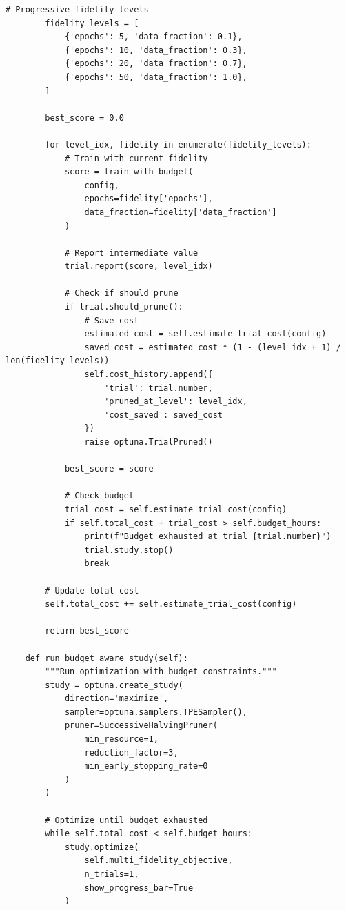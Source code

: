 \begin{lstlisting}[style=python, caption=Cost-efficient hyperparameter optimization]
        # Progressive fidelity levels
        fidelity_levels = [
            {'epochs': 5, 'data_fraction': 0.1},
            {'epochs': 10, 'data_fraction': 0.3},
            {'epochs': 20, 'data_fraction': 0.7},
            {'epochs': 50, 'data_fraction': 1.0},
        ]

        best_score = 0.0

        for level_idx, fidelity in enumerate(fidelity_levels):
            # Train with current fidelity
            score = train_with_budget(
                config,
                epochs=fidelity['epochs'],
                data_fraction=fidelity['data_fraction']
            )

            # Report intermediate value
            trial.report(score, level_idx)

            # Check if should prune
            if trial.should_prune():
                # Save cost
                estimated_cost = self.estimate_trial_cost(config)
                saved_cost = estimated_cost * (1 - (level_idx + 1) / len(fidelity_levels))
                self.cost_history.append({
                    'trial': trial.number,
                    'pruned_at_level': level_idx,
                    'cost_saved': saved_cost
                })
                raise optuna.TrialPruned()

            best_score = score

            # Check budget
            trial_cost = self.estimate_trial_cost(config)
            if self.total_cost + trial_cost > self.budget_hours:
                print(f"Budget exhausted at trial {trial.number}")
                trial.study.stop()
                break

        # Update total cost
        self.total_cost += self.estimate_trial_cost(config)

        return best_score

    def run_budget_aware_study(self):
        """Run optimization with budget constraints."""
        study = optuna.create_study(
            direction='maximize',
            sampler=optuna.samplers.TPESampler(),
            pruner=SuccessiveHalvingPruner(
                min_resource=1,
                reduction_factor=3,
                min_early_stopping_rate=0
            )
        )

        # Optimize until budget exhausted
        while self.total_cost < self.budget_hours:
            study.optimize(
                self.multi_fidelity_objective,
                n_trials=1,
                show_progress_bar=True
            )


\end{lstlisting}
